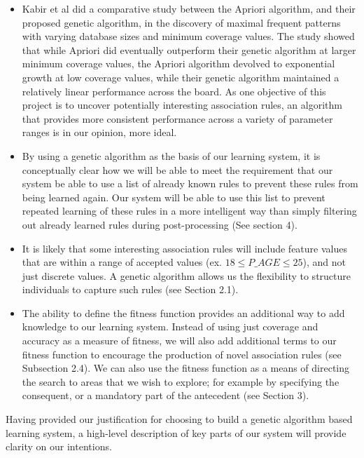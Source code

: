 \documentclass{amsart}
\theoremstyle{definition}
\theoremstyle{remark}
\numberwithin{equation}{section}
\begin{document}
%
\begin{itemize}
	\item 
    Kabir et al \cite{comparativeAnalysis} did a comparative study between the Apriori algorithm, and their proposed genetic algorithm, in the discovery of maximal frequent patterns with varying database sizes and minimum coverage values. The study showed that while Apriori did eventually outperform their genetic algorithm at larger minimum coverage values, the Apriori algorithm devolved to exponential growth at low coverage values, while their genetic algorithm maintained a relatively linear performance across the board. As one objective of this project is to uncover potentially interesting association rules, an algorithm that provides more consistent performance across a variety of parameter ranges is in our opinion, more ideal.   
	\item By using a genetic algorithm as the basis of our learning system, it is conceptually clear how we will be able to meet the requirement that our system be able to use a list of already known rules to prevent these rules from being learned again. Our system will be able to use this list to prevent repeated learning of these rules in a more intelligent way than simply filtering out already learned rules during post-processing (See section 4). 
    \item It is likely that some interesting association rules will include feature values that are within a range of accepted values (ex. $18 \leq P\_AGE \leq 25$), and not just discrete values. A genetic algorithm allows us the flexibility to structure individuals to capture such rules (see Section 2.1).
	\item The ability to define the fitness function provides an additional way to add knowledge to our learning system. Instead of using just coverage and accuracy as a measure of fitness, we will also add additional terms to our fitness function to encourage the production of novel association rules (see Subsection 2.4). We can also use the fitness function as a means of directing the search to areas that we wish to explore; for example by specifying the consequent, or a mandatory part of the antecedent (see Section 3).\newline
\end{itemize}

Having provided our justification for choosing to build a genetic algorithm based learning system, a high-level description of key parts of our system will provide clarity on our intentions. \newline
\end{document}
